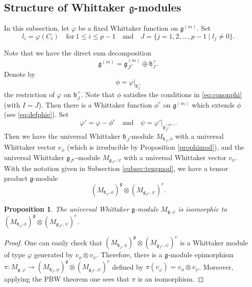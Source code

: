 \documentclass[12pt, reqno]{amsart}
\numberwithin{equation}{section}
\newtheorem{proposition}[theorem]{Proposition}%
\numberwithin{equation}{section}
\def\h{\mathfrak{h}}
\def\g{\mathfrak{g}}
\def\vf{\varphi}
\def\vvf{v_{\vf}}
\def\({\left(}
\def\){\right)}
\begin{document}
\subsection{Structure of Whittaker $\g$-modules}
In this subsection, let $\varphi$ be a fixed Whittaker function on $\g^{(m)}$. Set
\[
l_i=\vf(C_i)\quad \text{for}\ 1\leq i\leq p-1\quad \text{and}\quad
J=\{j=1,2,\dots,p-1\mid l_j\ne 0\}.
\]

Note that we have the direct sum decomposition  \[\g^{(m)}=\g_{J^C}^{(m)}\oplus \h_J^+.\]
Denote by
\[\phi=\varphi|_{\h_J^+}\] the restriction of $\varphi$ on $\h_J^{+}$. Note that $\phi$ satisfies the conditions in \eqref{eq:cononphi} (with $I=J$).
Then there is a Whittaker function $\phi^e$ on $\g^{(m)}$ which extends $\phi$ (see \eqref{eq:defphie}).
Set
\[
\varphi'=\varphi-\phi^e\quad \text{and}\quad
\psi=\varphi'|_{\g_{J^C}^{(m)}}.
\]
Then we have the universal Whittaker $\h_J$-module $M_{\h_J,\phi}$ with a universal Whittaker vector $v_\phi$ (which is irreducible by Proposition \ref{prophimod}),
and the universal Whittaker $\g_{J^C}$-module $M_{\g_{J^C},\psi}$ with a universal Whittaker vector $v_\psi$.
With the notation given in Subsection \ref{subsec:tengmod}, we have a tensor product $\g$-module
\[(M_{\h_J,\phi})^\g\otimes (M_{\g_{J^C},\psi})^e.\]



\begin{proposition}\label{propgmodiso}
The universal Whittaker $\g$-module $M_{\g,\varphi}$ is isomorphic to
$\(M_{\h_J,\phi}\)^\g\otimes \(M_{\g_{J^C},\psi}\)^e$.
\end{proposition}
\begin{proof}
 One can easily check that $\(M_{\h_J,\phi}\)^\g\otimes \(M_{\g_{J^C},\psi}\)^e$ is a Whittaker module
 of type $\vf$ generated by $v_\phi\otimes v_\psi$.
 Therefore, there is a $\g$-module epimorphism $\pi:M_{\g,\vf}\longrightarrow\(M_{\h_J,\phi}\)^\g\otimes \(M_{\g_{J^C},\psi}\)^e$ defined by
 $\pi(\vvf)=v_\phi\otimes v_\psi$.
 Moreover, applying the PBW theorem one sees that $\pi$ is an isomorphism.
\end{proof}
\end{document}
